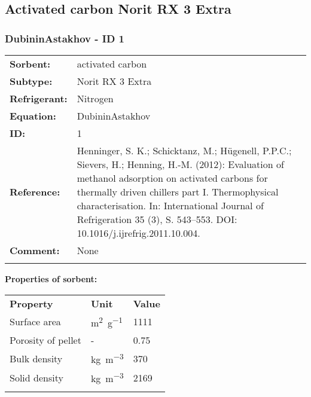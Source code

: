\subsection{Activated carbon Norit RX 3 Extra}
%
\subsubsection{DubininAstakhov - ID 1}
%
\begin{tabular}[l]{|lp{11.5cm}|}
\hline
\addlinespace

\textbf{Sorbent:} & activated carbon \\
\textbf{Subtype:} & Norit RX 3 Extra \\
\textbf{Refrigerant:} & Nitrogen \\
\textbf{Equation:} & DubininAstakhov \\
\textbf{ID:} & 1 \\
\textbf{Reference:} & Henninger, S. K.; Schicktanz, M.; Hügenell, P.P.C.; Sievers, H.; Henning, H.-M. (2012): Evaluation of methanol adsorption on activated carbons for thermally driven chillers part I. Thermophysical characterisation. In: International Journal of Refrigeration 35 (3), S. 543–553. DOI: 10.1016/j.ijrefrig.2011.10.004. \\
\textbf{Comment:} & None \\

\addlinespace
\hline
\end{tabular}
\newline

\textbf{Properties of sorbent:}
\newline
%
\begin{longtable}[l]{lll}
\toprule
\addlinespace
\textbf{Property} & \textbf{Unit} & \textbf{Value} \\
\addlinespace
\midrule
\endhead
\bottomrule
\endfoot
\bottomrule
\endlastfoot
\addlinespace

Surface area & \si{\square\meter\per\gram} & 1111\\
Porosity of pellet & - & 0.75\\
Bulk density & \si{\kilogram\per\cubic\meter} & 370\\
Solid density & \si{\kilogram\per\cubic\meter} & 2169\\

\addlinespace\end{longtable}

